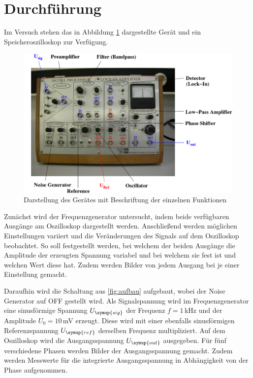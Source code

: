 \section{Durchführung}
\label{sec:Durchführung}
Im Versuch stehen das in Abbildung \ref{fig:geraet} dargestellte Gerät und ein
Speicheroszilloskop zur Verfügung.

\begin{figure}
  \centering
  \includegraphics[width=\textwidth]{data/geraet.png}
  \caption{Darstellung des Gerätes mit Beschriftung der einzelnen Funktionen
  \cite{Versuchsanleitung}}
  \label{fig:geraet}
\end{figure}


Zunächst wird der Frequenzgenerator untersucht, indem beide verfügbaren
Ausgänge am Oszilloskop dargestellt werden. Anschließend werden möglichen Einstellungen
variiert und die Veränderungen des Signals auf dem Oszilloskop beobachtet. So soll
festgestellt werden, bei welchem der beiden Ausgänge die Amplitude der erzeugten
Spannung variabel und bei welchem sie fest ist und welchen Wert diese hat. Zudem
werden Bilder von jedem Ausgang bei je einer Einstellung gemacht.

Daraufhin wird die Schaltung aus \ref{fig:aufbau} aufgebaut, wobei der Noise Generator
auf OFF gestellt wird. Als Signalspannung wird im Frequenzgenerator eine sinusförmige Spannung
$U_{\symup{sig}}$ der Frequenz $f=1$\,kHz und der Amplitude $U_0=10$\,mV erzeugt.
Diese wird mit  einer ebenfalls sinusförmigen Referenzspannung $U_{\symup{ref}}$
derselben Frequenz multipliziert. Auf dem Oszilloskop wird die Ausgangsspannung
$U_{\symup{out}}$ ausgegeben. Für fünf verschiedene Phasen werden Bilder der
Ausgangsspannung gemacht. Zudem werden Messwerte für die integrierte Ausgangsspannung
in Abhängigkeit von der Phase aufgenommen.

